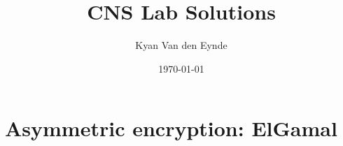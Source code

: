 \documentclass[11pt]{article}
\title{CNS Lab Solutions}
\author{Kyan Van den Eynde}
\date{\today}
\begin{document}
\maketitle
\tableofcontents

\part{Asymmetric encryption: ElGamal}

\end{document}
